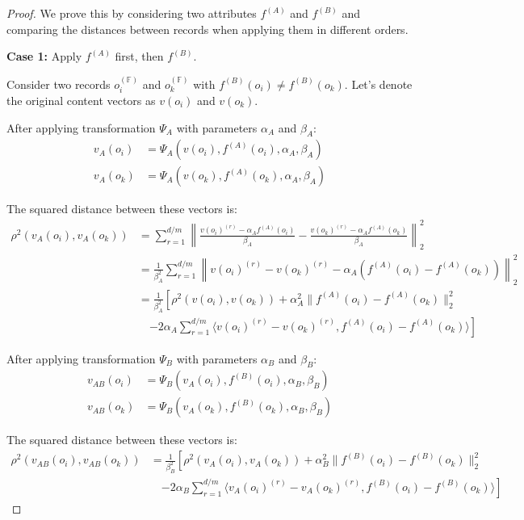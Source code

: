 \documentclass[numbers,sort]{article}
\begin{document}
\begin{proof}
We prove this by considering two attributes $f^{(A)}$ and $f^{(B)}$ and comparing the distances between records when applying them in different orders.

\noindent\textbf{Case 1:} Apply $f^{(A)}$ first, then $f^{(B)}$.

Consider two records $o_i^{(\mathbb{F})}$ and $o_k^{(\mathbb{F})}$ with $f^{(B)}(o_i) \neq f^{(B)}(o_k)$. Let's denote the original content vectors as $v(o_i)$ and $v(o_k)$.

After applying transformation $\Psi_A$ with parameters $\alpha_A$ and $\beta_A$:
\begin{align}
v_A(o_i) &= \Psi_A(v(o_i), f^{(A)}(o_i), \alpha_A, \beta_A) \\
v_A(o_k) &= \Psi_A(v(o_k), f^{(A)}(o_k), \alpha_A, \beta_A)
\end{align}

The squared distance between these vectors is:
\begin{align}
\rho^2(v_A(o_i), v_A(o_k)) &= \sum_{r=1}^{d/m} \left\|\frac{v(o_i)^{(r)} - \alpha_A f^{(A)}(o_i)}{\beta_A} - \frac{v(o_k)^{(r)} - \alpha_A f^{(A)}(o_k)}{\beta_A}\right\|_2^2 \\
&= \frac{1}{\beta_A^2} \sum_{r=1}^{d/m} \left\|v(o_i)^{(r)} - v(o_k)^{(r)} - \alpha_A(f^{(A)}(o_i) - f^{(A)}(o_k))\right\|_2^2 \\
&= \frac{1}{\beta_A^2} \left[ \rho^2(v(o_i), v(o_k)) + \alpha_A^2 \|f^{(A)}(o_i) - f^{(A)}(o_k)\|_2^2 \right. \\
&\quad \left. - 2\alpha_A \sum_{r=1}^{d/m} \langle v(o_i)^{(r)} - v(o_k)^{(r)}, f^{(A)}(o_i) - f^{(A)}(o_k) \rangle \right]
\end{align}

After applying transformation $\Psi_B$ with parameters $\alpha_B$ and $\beta_B$:
\begin{align}
v_{AB}(o_i) &= \Psi_B(v_A(o_i), f^{(B)}(o_i), \alpha_B, \beta_B) \\
v_{AB}(o_k) &= \Psi_B(v_A(o_k), f^{(B)}(o_k), \alpha_B, \beta_B)
\end{align}

The squared distance between these vectors is:
\begin{align}
\rho^2(v_{AB}(o_i), v_{AB}(o_k)) &= \frac{1}{\beta_B^2} \left[ \rho^2(v_A(o_i), v_A(o_k)) + \alpha_B^2 \|f^{(B)}(o_i) - f^{(B)}(o_k)\|_2^2 \right. \\
&\quad \left. - 2\alpha_B \sum_{r=1}^{d/m} \langle v_A(o_i)^{(r)} - v_A(o_k)^{(r)}, f^{(B)}(o_i) - f^{(B)}(o_k) \rangle \right]
\end{align}


\end{proof}
\end{document}
